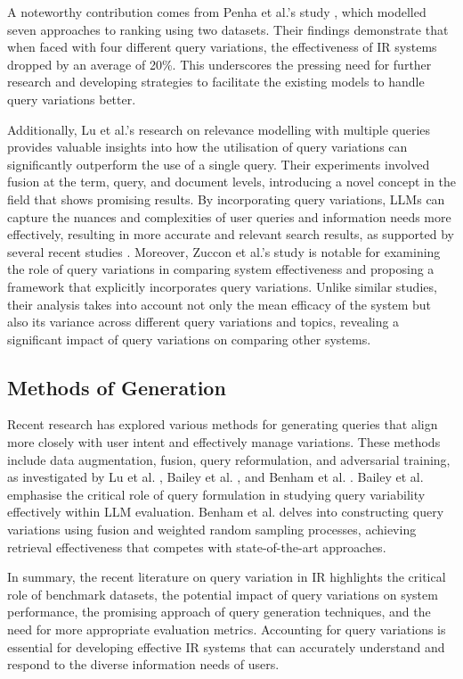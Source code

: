 A noteworthy contribution comes from Penha et al.'s study \cite{penha2022}, which modelled seven approaches to ranking using two datasets. Their findings demonstrate that when faced with four different query variations, the effectiveness of IR systems dropped by an average of 20\%. This underscores the pressing need for further research and developing strategies to facilitate the existing models to handle query variations better.

Additionally, Lu et al.'s research \cite{lu} on relevance modelling with multiple queries provides valuable insights into how the utilisation of query variations can significantly outperform the use of a single query. Their experiments involved fusion at the term, query, and document levels, introducing a novel concept in the field that shows promising results. By incorporating query variations, LLMs can capture the nuances and complexities of user queries and information needs more effectively, resulting in more accurate and relevant search results, as supported by several recent studies \cite{penha2022, characterbert, zendel, lu}. Moreover, Zuccon et al.'s study \cite{zuccon} is notable for examining the role of query variations in comparing system effectiveness and proposing a framework that explicitly incorporates query variations. Unlike similar studies, their analysis takes into account not only the mean efficacy of the system but also its variance across different query variations and topics, revealing a significant impact of query variations on comparing other systems.

\subsection{Methods of Generation}
Recent research has explored various methods for generating queries that align more closely with user intent and effectively manage variations. These methods include data augmentation, fusion, query reformulation, and adversarial training, as investigated by Lu et al. \cite{lu}, Bailey et al. \cite{bailey}, and Benham et al. \cite{benham}. Bailey et al. emphasise the critical role of query formulation in studying query variability effectively within LLM evaluation. Benham et al. delves into constructing query variations using fusion and weighted random sampling processes, achieving retrieval effectiveness that competes with state-of-the-art approaches.

In summary, the recent literature on query variation in IR highlights the critical role of benchmark datasets, the potential impact of query variations on system performance, the promising approach of query generation techniques, and the need for more appropriate evaluation metrics. Accounting for query variations is essential for developing effective IR systems that can accurately understand and respond to the diverse information needs of users.